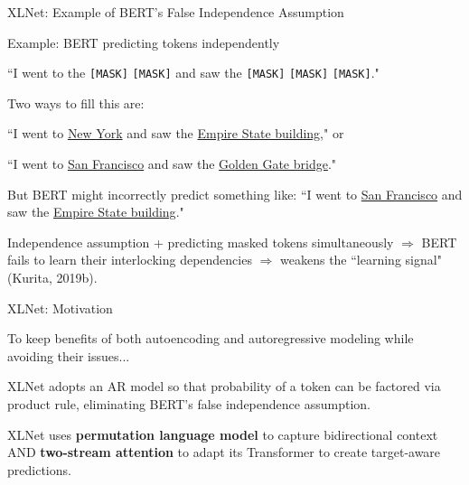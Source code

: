 \begin{frame}{XLNet: Example of BERT's False Independence Assumption}
    
    \vspace{10pt}
    
    \begin{exampleBlock}{Example: BERT predicting tokens independently}
    \footnotesize 
    
    ``I went to the \texttt{[MASK]} \texttt{[MASK]} and saw the \texttt{[MASK]} \texttt{[MASK]} \texttt{[MASK]}." \newline 
    
    Two ways to fill this are: \newline
    
    ``I went to \underline{New York} and saw the \underline{Empire State building}," or\newline
    
    ``I went to \underline{San Francisco} and saw the \underline{Golden Gate bridge}."\newline
    
    But BERT might incorrectly predict something like: ``I went to \underline{San Francisco} and saw the \underline{Empire State building}." \newline
    
    Independence assumption + predicting masked tokens simultaneously $\Rightarrow$ BERT fails to learn their interlocking dependencies $\Rightarrow$ weakens the ``learning signal" (Kurita, 2019b). 
    \end{exampleBlock}

\end{frame}


\begin{frame}{XLNet: Motivation}

    \footnotesize  
    
    To keep benefits of both autoencoding and autoregressive modeling while avoiding their issues...
    
    \begin{enumerateSpaced}{7pt}
        \item XLNet adopts an AR model so that probability of a token can be factored via product rule, eliminating BERT's false independence assumption. 
        
        \item XLNet uses \textbf{permutation language model} to capture bidirectional context AND \textbf{two-stream attention} to adapt its Transformer to create target-aware predictions. 
    \end{enumerateSpaced}
    
\end{frame}



